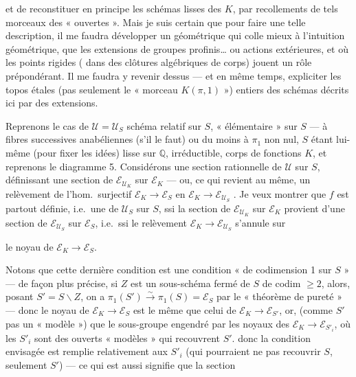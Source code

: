 \documentclass[11pt,a4paper]{article}
\begin{document}

et de reconstituer en principe les schémas lisses  des $K$, par recollements de tels morceaux  des «  ouvertes ». Mais je suis certain que pour faire une telle description, il me faudra développer un  géométrique qui colle mieux à l'intuition géométrique, que les  extensions de groupes profinis… ou actions extérieures, et où les points rigides (  dans des clôtures algébriques de corps) jouent un rôle prépondérant. Il me faudra y revenir dessus --- et en même temps, expliciter les topos étales (pas seulement le « morceau $K(\pi,1)$ »)  entiers des schémas décrits ici par des extensions.

Reprenons le cas de $\mathcal{U} = \mathcal{U}_S$ schéma relatif sur $S$, « élémentaire » sur $S$ --- à fibres successives anabéliennes (s'il le faut) ou du moins à $\pi_1$ non nul, $S$ étant lui-même (pour fixer les idées) lisse sur $\mathbb{Q}$, irréductible, corps de fonctions $K$, et reprenons le diagramme 5. Considérons une section rationnelle  de $\mathcal{U}$ sur $S$, définissant une section de $\mathcal{E}_{\mathcal{U}_K}$ sur $\mathcal{E}_K$ --- ou, ce qui revient au même, un relèvement  de l'hom.\ surjectif $\mathcal{E}_K \to \mathcal{E}_S$ en $\mathcal{E}_K \to \mathcal{E}_{\mathcal{U}_S}$ . Je veux montrer que $f$ est partout définie, i.e.\ une   de $\mathcal{U}_S$ sur $S$, ssi la section de $\mathcal{E}_{\mathcal{U}_K}$ sur $\mathcal{E}_K$ provient d'une section de $\mathcal{E}_{\mathcal{U}_S}$ sur $\mathcal{E}_S$, i.e.\ ssi le relèvement $\mathcal{E}_K \to \mathcal{E}_{\mathcal{U}_S}$ s'annule sur


le noyau de $\mathcal{E}_K \to \mathcal{E}_S$.

Notons que cette dernière condition est une condition « de codimension 1 sur $S$ » --- de façon plus précise, si $Z$ est un sous-schéma fermé de $S$ de codim $\geqslant 2$,  alors, posant $S' = S \smallsetminus Z$, on a $\pi_1(S') \xrightarrow{\sim} \pi_1(S) = \mathcal{E}_S$ par le « théorème de pureté » --- donc le noyau de  $\mathcal{E}_K \to \mathcal{E}_S$ est le même que celui de $\mathcal{E}_K \to \mathcal{E}_{S'}$, or,  (comme $S'$  pas un « modèle ») que le sous-groupe  engendré par les noyaux des $\mathcal{E}_K \to \mathcal{E}_{S'_i}$, où les $S'_i$ sont des ouverts « modèles » qui recouvrent $S'$.  donc la condition envisagée est remplie relativement aux $S'_i$ (qui pourraient \struck{\ill{}} ne pas recouvrir $S$, seulement $S'$) --- ce qui est aussi signifie que la section
\end{document}
